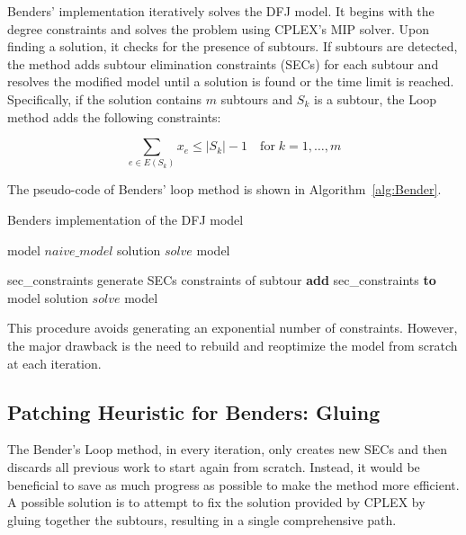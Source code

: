 Benders' implementation iteratively solves the DFJ model. It begins with the degree constraints and solves the problem using CPLEX's MIP solver. Upon finding a solution, it checks for the presence of subtours. If subtours are detected, the method adds subtour elimination constraints (SECs) for each subtour and resolves the modified model until a solution is found or the time limit is reached. Specifically, if the solution contains \( m \) subtours and \( S_k \) is a subtour, the Loop method adds the following constraints:

\[
\sum_{e \in E(S_k)} x_e \leq |S_k| - 1 \quad \text{for} \; k = 1, \ldots, m
\]

The pseudo-code of Benders’ loop method is shown in Algorithm~\ref{alg:Bender}.

\begin{algorithm}[H]
    \caption{Benders implementation of the DFJ model}
    \label{alg:Bender}
    \begin{spacing}{1.2} %
        \BlankLine
        model \leftarrow $naive\_model$\;
        solution \leftarrow $solve$ model\;

        {
            {
                sec\_constraints \leftarrow generate SECs constraints of subtour\;
                \textbf{add} sec\_constraints \textbf{to} model\;
            }
            solution \leftarrow $solve$ model
        }
        \BlankLine
    \end{spacing}
\end{algorithm}

This procedure avoids generating an exponential number of constraints. However, the major drawback is the need to rebuild and reoptimize the model from scratch at each iteration.

\subsection{Patching Heuristic for Benders: Gluing}
The Bender's Loop method, in every iteration, only creates new SECs and then discards all previous work to start again from scratch. Instead, it would be beneficial to save as much progress as possible to make the method more efficient. A possible solution is to attempt to fix the solution provided by CPLEX by gluing together the subtours, resulting in a single comprehensive path.

